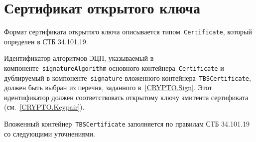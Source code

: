 \section{Сертификат открытого ключа}\label{FMT.Cert}

Формат сертификата открытого ключа описывается типом~\texttt{Certificate}, 
который определен в СТБ 34.101.19.

Идентификатор алгоритмов ЭЦП, указываемый в
компоненте~\texttt{signatureAlgorithm} основного 
контейнера~\texttt{Certificate} и дублируемый в 
компоненте~\texttt{signature} вложенного 
контейнера~\texttt{TBSCertificate}, должен быть выбран из перечня, 
заданного в~\ref{CRYPTO.Sign}. Этот идентификатор должен соответствовать
открытому ключу эмитента сертификата (см.~\ref{CRYPTO.Keypair}).

Вложенный контейнер~\texttt{TBSCertificate} заполняется по правилам СТБ 
34.101.19 со следующими уточнениями.
